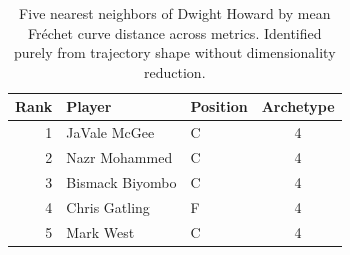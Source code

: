 \begin{table}[htbp]
  \centering\small
  \begin{tabular}{rllc}
    \toprule
    Rank & Player & Position & Archetype \\
    \midrule
    1 & JaVale McGee & C & 4 \\
    2 & Nazr Mohammed & C & 4 \\
    3 & Bismack Biyombo & C & 4 \\
    4 & Chris Gatling & F & 4 \\
    5 & Mark West & C & 4 \\
    \bottomrule
  \end{tabular}
  \caption{Five nearest neighbors of Dwight Howard by mean Fr\'{e}chet curve distance across metrics. Identified purely from trajectory shape without dimensionality reduction.}
  \label{tab:Dwight_Howard_frechet_curve_neighbors}
\end{table}

